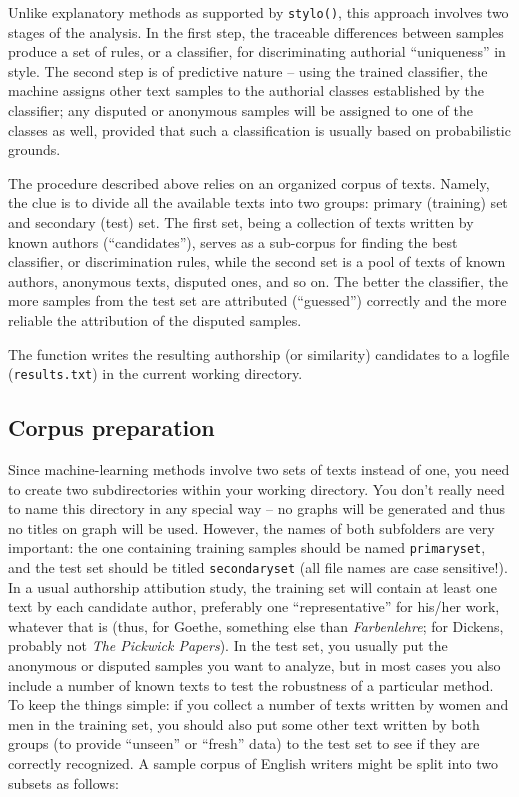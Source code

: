 \documentclass[11pt,a4paper]{article}
\def\underscore{\raisebox{-.8ex}{-}}
\def\code#1{{\tt #1}}
\begin{document}
Unlike explanatory methods as supported by \code{stylo()}, this
approach involves two stages of the analysis. In the first step, 
the traceable differences between samples produce a set of rules, 
or a classifier, for discriminating authorial ``uniqueness'' in style. 
The second step is of predictive nature -- using the trained classifier, 
the machine assigns other text samples to the authorial classes established 
by the classifier; any disputed or anonymous samples will be assigned to one 
of the classes as well, provided that such a classification is usually based 
on probabilistic grounds.

The procedure described above relies on an organized corpus of texts. 
Namely, the clue is to divide all the available texts into two groups: 
primary (training) set and secondary (test) set. The first set, being 
a collection of texts written by known authors (``candidates''), serves 
as a sub-corpus for finding the best classifier, or discrimination rules, 
while the second set is a pool of texts of known authors, anonymous texts, 
disputed ones, and so on. The better the classifier, the more samples from 
the test set are attributed (``guessed'') correctly and the more reliable 
the attribution of the disputed samples.

The function writes the resulting authorship (or similarity) candidates
to a logfile (\code{results.txt}) in the current working directory.



\subsection{Corpus preparation}

Since machine-learning methods involve two sets of texts instead of
one, you need to create two subdirectories within your working directory.
You don't really need to name this directory in any special way --
no graphs will be generated and thus no titles on graph will be used.
However, the names of both subfolders are very important: the one
containing training samples should be named \code{primary\underscore{}set},
and the test set should be titled \code{secondary\underscore{}set}
(all file names are case sensitive!). In a usual authorship attibution
study, the training set will contain at least one text by each candidate author,
preferably one ``representative'' for his/her work, whatever that is
(thus, for Goethe, something else than \emph{Farbenlehre}; for Dickens,
probably not \emph{The Pickwick Papers}). In the test set, you usually
put the anonymous or disputed samples you want to analyze, but in
most cases you also include a number of known texts to test the robustness
of a particular method. To keep the things simple: if you collect
a number of texts written by women and men in the training set, you
should also put some other text written by both groups (to provide ``unseen'' 
or ``fresh'' data) to the test set to see if they are correctly recognized.
A sample corpus of English writers might be split into two subsets
as follows:
\end{document}
